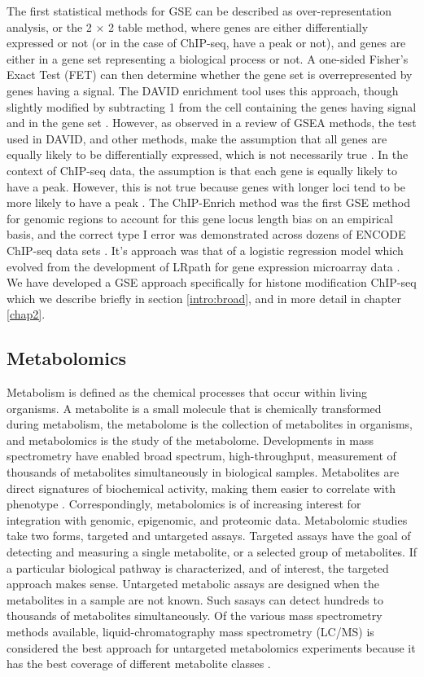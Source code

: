 The first statistical methods for GSE can be described as over-representation analysis, or the 2 $\times$ 2 table method, where genes are either differentially expressed or not (or in the case of ChIP-seq, have a peak or not), and genes are either in a gene set representing a biological process or not. A one-sided Fisher's Exact Test (FET) can then determine whether the gene set is overrepresented by genes having a signal. The DAVID enrichment tool uses this approach, though slightly modified by subtracting 1 from the cell containing the genes having signal and in the gene set \cite{Huang:2009gk}. However, as observed in a review of GSEA methods, the test used in DAVID, and other methods, make the assumption that all genes are equally likely to be differentially expressed, which is not necessarily true \cite{Khatri:2012fy}. In the context of ChIP-seq data, the assumption is that each gene is equally likely to have a peak. However, this is not true because genes with longer loci tend to be more likely to have a peak \cite{Taher:2009ko}. The ChIP-Enrich method was the first GSE method for genomic regions to account for this gene locus length bias on an empirical basis, and the correct type I error was demonstrated across dozens of ENCODE ChIP-seq data sets \cite{Welch:2014fb}. It's approach was that of a logistic regression model which evolved from the development of LRpath for gene expression microarray data \cite{Sartor:2008by}. We have developed a GSE approach specifically for histone modification ChIP-seq which we describe briefly in section \ref{intro:broad}, and in more detail in chapter \ref{chap2}.

\subsection{Metabolomics}

Metabolism is defined as the chemical processes that occur within living organisms. A metabolite is a small molecule that is chemically transformed during metabolism, the metabolome is the collection of metabolites in organisms, and metabolomics is the study of the metabolome. Developments in mass spectrometry have enabled broad spectrum, high-throughput, measurement of thousands of metabolites simultaneously in biological samples. Metabolites are direct signatures of biochemical activity, making them easier to correlate with phenotype \cite{Patti:2012ek}. Correspondingly, metabolomics is of increasing interest for integration with genomic, epigenomic, and proteomic data. Metabolomic studies take two forms, targeted and untargeted assays. Targeted assays have the goal of detecting and measuring a single metabolite, or a selected group of metabolites. If a particular biological pathway is characterized, and of interest, the targeted approach makes sense. Untargeted metabolic assays are designed when the metabolites in a sample are not known. Such sasays can detect hundreds to thousands of metabolites simultaneously. Of the various mass spectrometry methods available, liquid-chromatography mass spectrometry (LC/MS) is considered the best approach for untargeted metabolomics experiments because it has the best coverage of different metabolite classes \cite{Buscher:2009ko}.

